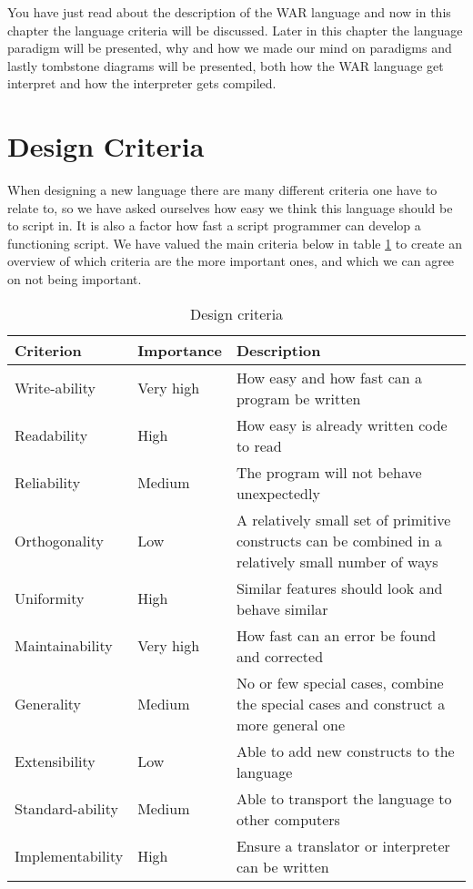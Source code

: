 You have just read about the description of the WAR language and now in this chapter the language criteria will be discussed. Later in this chapter the language paradigm will be presented, why and how we made our mind on paradigms and lastly tombstone diagrams will be presented, both how the WAR language get interpret and how the interpreter gets compiled.
\section{Design Criteria}
\label{chap:DesCrit}
When designing a new language there are many different criteria one have to relate to, so we have asked ourselves how easy we think this language should be to script in. It is also a factor how fast a script programmer can develop a functioning script. We have valued the main criteria below in table \ref{tab:criteria_tabular} to create an overview of which criteria are the more important ones, and which we can agree on not being important.   

\begin{table}[H]
	\begin{tabular}{| 	l	|	 l	| p{7cm}	|}
	\hline
	Criterion			&	Importance	&		Description	\\	
	\hline
	Write-ability 		& 	Very high	&		How easy and how fast can a program be written\\
	Readability			& 	High		&		How easy is already written code to read\\
	Reliability			& 	Medium		&		The program will not behave unexpectedly\\
	Orthogonality		& 	Low			&		A relatively small set of primitive constructs can be combined in a relatively small number of ways\\
	Uniformity			& 	High		&		Similar features should look and behave similar\\
	Maintainability		& 	Very high	&		How fast can an error be found and corrected\\
	Generality			& 	Medium		&		No or few special cases, combine the special cases and construct a more general one\\
	Extensibility		& 	Low			&		Able to add new constructs to the language\\
	Standard-ability		& 	Medium		&		Able to transport the language to other computers\\
	Implementability	& 	High			&		Ensure a translator or interpreter can be written\\
	\hline
	\end{tabular}
	\caption{Design criteria \cite{criteria}}
	\label{tab:criteria_tabular}
\end{table}


